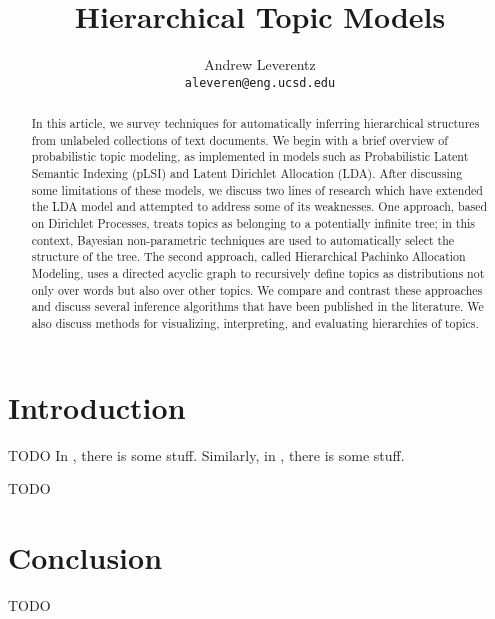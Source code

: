 \documentclass{article}
\title{Hierarchical Topic Models}
\author{
  Andrew Leverentz \\
  \texttt{aleveren@eng.ucsd.edu} \\
}
\begin{document}
\maketitle

\begin{abstract}
In this article, we survey techniques for automatically inferring hierarchical structures from unlabeled collections of text documents.
We begin with a brief overview of probabilistic topic modeling, as implemented in models such as Probabilistic Latent Semantic Indexing (pLSI) and Latent Dirichlet Allocation (LDA).
After discussing some limitations of these models, we discuss two lines of research which have extended the LDA model and attempted to address some of its weaknesses.
One approach, based on Dirichlet Processes, treats topics as belonging to a potentially infinite tree; in this context, Bayesian non-parametric techniques are used to automatically select the structure of the tree.
The second approach, called Hierarchical Pachinko Allocation Modeling, uses a directed acyclic graph to recursively define topics as distributions not only over words but also over other topics.
We compare and contrast these approaches and discuss several inference algorithms that have been published in the literature.
We also discuss methods for visualizing, interpreting, and evaluating hierarchies of topics.
\end{abstract}

\section{Introduction}
TODO
In \cite{paisley2015nested}, there is some stuff.
Similarly, in \cite{blei2010nested}, there is some stuff.

TODO

\section{Conclusion}
TODO


\nocite{*}
%


\end{document}

